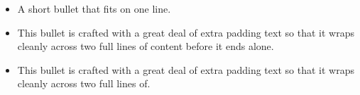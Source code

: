 \documentclass[letterpaper,11pt]{article}
\begin{document}
\begin{itemize}[leftmargin=0.15in, label={}]
  \item\small{A short bullet that fits on one line.}
  \item\small{This bullet is crafted with a great deal of extra padding text so that it wraps cleanly across two full lines of content before it ends alone.}
  \item\small{This bullet is crafted with a great deal of extra padding text so that it wraps cleanly across two full lines of.}
\end{itemize}
\end{document}
